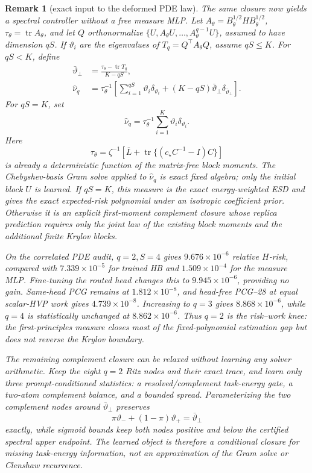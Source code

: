 \documentclass[11pt,a4paper]{article}
\newtheorem{remark}{Remark}
\theoremstyle{definition}
\begin{document}
\begin{remark}[exact input to the deformed PDE law]
The same closure now yields a spectral controller without a free measure MLP.
Let \(A_\theta=B_\theta^{1/2}HB_\theta^{1/2}\),
\(\tau_\theta=\operatorname{tr}A_\theta\), and let \(Q\) orthonormalize
\(\{U,A_\theta U,\ldots,A_\theta^{q-1}U\}\), assumed to have dimension
\(qS\).  If \(\vartheta_i\) are the eigenvalues of
\(T_q=Q^\top A_\theta Q\), assume \(qS\le K\). For \(qS<K\), define
\[
 \begin{aligned}
 \bar\vartheta_\perp
 &=\frac{\tau_\theta-\operatorname{tr}T_q}{K-qS},\\
 \widehat\nu_q
 &=\tau_\theta^{-1}\left[
 \sum_{i=1}^{qS}\vartheta_i\delta_{\vartheta_i}
 +(K-qS)\bar\vartheta_\perp\delta_{\bar\vartheta_\perp}\right].
 \end{aligned}
 \label{eq:pde-routed-krylov-measure}
\]
For \(qS=K\), set
\[
 \widehat\nu_q
 =\tau_\theta^{-1}\sum_{i=1}^{K}
 \vartheta_i\delta_{\vartheta_i}.
\]
Here
\[
 \tau_\theta
 =\zeta^{-1}\left[\overline L+
 \operatorname{tr}\{(c_\star C^{-1}-I)C\}\right]
\]
is already a deterministic function of the matrix-free block moments.  The
Chebyshev-basis Gram solve applied to \(\widehat\nu_q\) is exact fixed
algebra; only the initial block \(U\) is learned.  If \(qS=K\), this measure
is the exact energy-weighted ESD and gives the exact expected-risk polynomial
under an isotropic coefficient prior.  Otherwise it is an explicit
first-moment complement closure whose replica prediction requires only the
joint law of the existing block moments and the additional finite Krylov
blocks.

On the correlated PDE audit, \(q=2,S=4\) gives
\(9.676\times10^{-6}\) relative \(H\)-risk, compared with
\(7.339\times10^{-5}\) for trained HB and \(1.509\times10^{-4}\) for the
measure MLP.  Fine-tuning the routed head changes this to
\(9.945\times10^{-6}\), providing no gain.  Same-head PCG remains at
\(1.812\times10^{-8}\), and head-free PCG--28 at equal scalar-HVP work gives
\(4.739\times10^{-8}\).  Increasing to \(q=3\) gives
\(8.868\times10^{-6}\), while \(q=4\) is statistically unchanged at
\(8.862\times10^{-6}\).  Thus \(q=2\) is the risk--work knee: the
first-principles measure closes most of the fixed-polynomial estimation gap
but does not reverse the Krylov boundary.

The remaining complement closure can be relaxed without learning any solver
arithmetic.  Keep the eight $q=2$ Ritz nodes and their exact trace, and learn
only three prompt-conditioned statistics: a resolved/complement task-energy
gate, a two-atom complement balance, and a bounded spread.  Parameterizing
the two complement nodes around $\bar\vartheta_\perp$ preserves
\[
 \pi\vartheta_-+(1-\pi)\vartheta_+
 =\bar\vartheta_\perp
\]
exactly, while sigmoid bounds keep both nodes positive and below the certified
spectral upper endpoint.  The learned object is therefore a conditional
closure for missing task-energy information, not an approximation of the
Gram solve or Clenshaw recurrence.


\end{remark}
\end{document}
